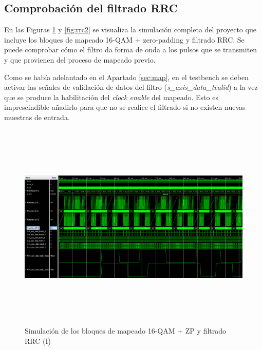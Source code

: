 \pagebreak

\subsection{Comprobación del filtrado RRC}
\label{sec:fir}

En las Figuras \ref{fig:rrc1} y \ref{fig:rrc2} se visualiza la simulación completa del proyecto que incluye los bloques de mapeado 16-QAM + zero-padding y filtrado RRC. Se puede comprobar cómo el filtro da forma de onda a los pulsos que se transmiten y que provienen del proceso de mapeado previo.

Como se había adelantado en el Apartado \ref{sec:map}, en el testbench se deben activar las señales de validación de datos del filtro (\textit{s\_axis\_data\_tvalid}) a la vez que se produce la habilitación del \textit{clock enable} del mapeado. Esto es imprescindible añadirlo para que no se realice el filtrado si no existen nuevas muestras de entrada. 

\vspace{3mm}

\begin{figure}[h]
	\centering
	\includegraphics[width=1\textwidth, height=10cm]{img/simu/rrc.PNG}
	\caption{Simulación de los bloques de mapeado 16-QAM + ZP y filtrado RRC (I)}
	\label{fig:rrc1}
\end{figure}

\vspace{3mm}

